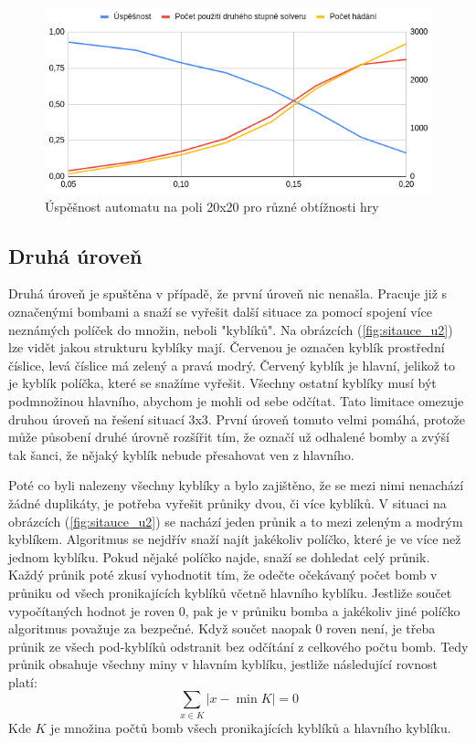 \begin{figure}[ht!]
    \centering
    \includegraphics[scale=0.60]{images/uspesnost.png}
    \caption{Úspěšnost automatu na poli 20x20 pro různé obtížnosti hry}
    \label{fig:uspesnost}
\end{figure}

\subsection{Druhá úroveň}
Druhá úroveň je spuštěna v případě, že první úroveň nic nenašla. Pracuje již s označenými bombami a snaží se vyřešit další
situace za pomocí spojení více neznámých políček do množin, neboli "kyblíků". Na obrázcích (\ref{fig:sitauce_u2}) lze vidět jakou
strukturu kyblíky mají. Červenou je označen kyblík prostřední číslice, levá číslice má zelený a pravá modrý. Červený kyblík je
hlavní, jelikož to je kyblík políčka, které se snažíme vyřešit. Všechny ostatní kyblíky musí být podmnožinou hlavního, abychom je
mohli od sebe odčítat. Tato limitace omezuje druhou úroveň na řešení situací 3x3. První úroveň tomuto velmi pomáhá, protože může
působení druhé úrovně rozšířit tím, že označí už odhalené bomby a zvýší tak šanci, že nějaký kyblík nebude přesahovat ven z
hlavního.

Poté co byli nalezeny všechny kyblíky a bylo zajištěno, že se mezi nimi nenachází žádné duplikáty, je potřeba vyřešit průniky
dvou, či více kyblíků. V situaci na obrázcích (\ref{fig:sitauce_u2}) se nachází jeden průnik a to mezi zeleným a modrým kyblíkem.
Algoritmus se nejdřív snaží najít jakékoliv políčko, které je ve více než jednom kyblíku. Pokud nějaké políčko najde, snaží se
dohledat celý průnik. Každý průnik poté zkusí vyhodnotit tím, že odečte očekávaný počet bomb v průniku od všech pronikajících
kyblíků včetně hlavního kyblíku. Jestliže součet vypočítaných hodnot je roven $0$, pak je v průniku bomba a jakékoliv jiné
políčko algoritmus považuje za bezpečné. Když součet naopak $0$ roven není, je třeba průnik ze všech pod-kyblíků odstranit bez
odčítání z celkového počtu bomb. Tedy průnik obsahuje všechny miny v hlavním kyblíku, jestliže následující rovnost platí:
\begin{equation*}
\sum_{x \in K} |x-\min K| = 0
\end{equation*}
Kde $K$ je množina počtů bomb všech pronikajících kyblíků a hlavního kyblíku.

